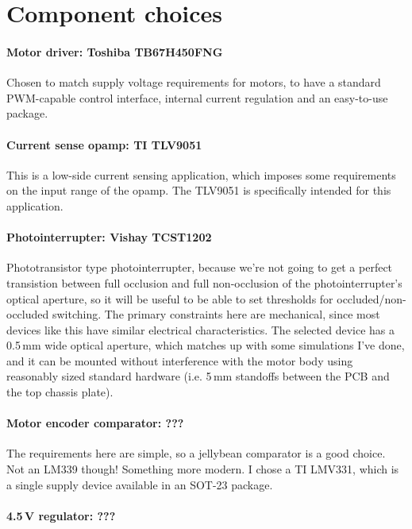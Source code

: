\documentclass[a4paper,11pt,article]{memoir}
\begin{document}
\section*{Component choices}

\paragraph{Motor driver: Toshiba TB67H450FNG}

Chosen to match supply voltage requirements for motors, to have a
standard PWM-capable control interface, internal current regulation
and an easy-to-use package.

\paragraph{Current sense opamp: TI TLV9051}

This is a low-side current sensing application, which imposes some
requirements on the input range of the opamp. The TLV9051 is
specifically intended for this application.

\paragraph{Photointerrupter: Vishay TCST1202}

Phototransistor type photointerrupter, because we're not going to get
a perfect transistion between full occlusion and full non-occlusion of
the photointerrupter's optical aperture, so it will be useful to be
able to set thresholds for occluded/non-occluded switching. The
primary constraints here are mechanical, since most devices like this
have similar electrical characteristics. The selected device has a
0.5\,mm wide optical aperture, which matches up with some simulations
I've done, and it can be mounted without interference with the motor
body using reasonably sized standard hardware (i.e. 5\,mm standoffs
between the PCB and the top chassis plate).

\paragraph{Motor encoder comparator: ???}

The requirements here are simple, so a jellybean comparator is a good
choice. Not an LM339 though! Something more modern. I chose a TI
LMV331, which is a single supply device available in an SOT-23 package.

\paragraph{4.5\,V regulator: ???}
\end{document}
